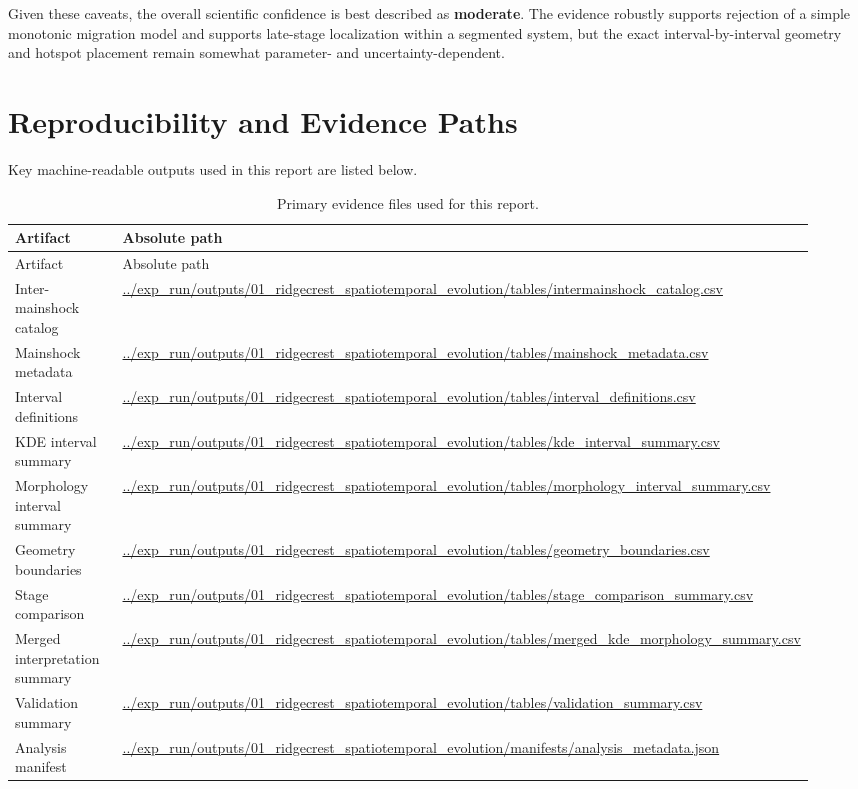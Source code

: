 \documentclass[11pt]{article}
\begin{document}
Given these caveats, the overall scientific confidence is best described as \textbf{moderate}. The evidence robustly supports rejection of a simple monotonic migration model and supports late-stage localization within a segmented system, but the exact interval-by-interval geometry and hotspot placement remain somewhat parameter- and uncertainty-dependent.

\section{Reproducibility and Evidence Paths}
Key machine-readable outputs used in this report are listed below.

\begin{longtable}{p{0.25\linewidth}p{0.68\linewidth}}
\caption{Primary evidence files used for this report.}\label{tab:files}\\
\toprule
Artifact & Absolute path \\
\midrule
\endfirsthead
\toprule
Artifact & Absolute path \\
\midrule
\endhead
Inter-mainshock catalog & \url{../exp_run/outputs/01_ridgecrest_spatiotemporal_evolution/tables/intermainshock_catalog.csv} \\
Mainshock metadata & \url{../exp_run/outputs/01_ridgecrest_spatiotemporal_evolution/tables/mainshock_metadata.csv} \\
Interval definitions & \url{../exp_run/outputs/01_ridgecrest_spatiotemporal_evolution/tables/interval_definitions.csv} \\
KDE interval summary & \url{../exp_run/outputs/01_ridgecrest_spatiotemporal_evolution/tables/kde_interval_summary.csv} \\
Morphology interval summary & \url{../exp_run/outputs/01_ridgecrest_spatiotemporal_evolution/tables/morphology_interval_summary.csv} \\
Geometry boundaries & \url{../exp_run/outputs/01_ridgecrest_spatiotemporal_evolution/tables/geometry_boundaries.csv} \\
Stage comparison & \url{../exp_run/outputs/01_ridgecrest_spatiotemporal_evolution/tables/stage_comparison_summary.csv} \\
Merged interpretation summary & \url{../exp_run/outputs/01_ridgecrest_spatiotemporal_evolution/tables/merged_kde_morphology_summary.csv} \\
Validation summary & \url{../exp_run/outputs/01_ridgecrest_spatiotemporal_evolution/tables/validation_summary.csv} \\
Analysis manifest & \url{../exp_run/outputs/01_ridgecrest_spatiotemporal_evolution/manifests/analysis_metadata.json} \\
\bottomrule
\end{longtable}
\end{document}

